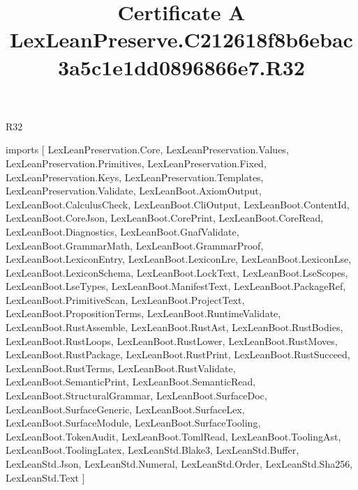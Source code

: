\begin{lexlean}{R32}
\title{Certificate A LexLeanPreserve.C212618f8b6ebac3a5c1e1dd0896866e7.R32}
\begin{coremodule}
imports [
  LexLeanPreservation.Core,
  LexLeanPreservation.Values,
  LexLeanPreservation.Primitives,
  LexLeanPreservation.Fixed,
  LexLeanPreservation.Keys,
  LexLeanPreservation.Templates,
  LexLeanPreservation.Validate,
  LexLeanBoot.AxiomOutput,
  LexLeanBoot.CalculusCheck,
  LexLeanBoot.CliOutput,
  LexLeanBoot.ContentId,
  LexLeanBoot.CoreJson,
  LexLeanBoot.CorePrint,
  LexLeanBoot.CoreRead,
  LexLeanBoot.Diagnostics,
  LexLeanBoot.GnafValidate,
  LexLeanBoot.GrammarMath,
  LexLeanBoot.GrammarProof,
  LexLeanBoot.LexiconEntry,
  LexLeanBoot.LexiconLre,
  LexLeanBoot.LexiconLse,
  LexLeanBoot.LexiconSchema,
  LexLeanBoot.LockText,
  LexLeanBoot.LseScopes,
  LexLeanBoot.LseTypes,
  LexLeanBoot.ManifestText,
  LexLeanBoot.PackageRef,
  LexLeanBoot.PrimitiveScan,
  LexLeanBoot.ProjectText,
  LexLeanBoot.PropositionTerms,
  LexLeanBoot.RuntimeValidate,
  LexLeanBoot.RustAssemble,
  LexLeanBoot.RustAst,
  LexLeanBoot.RustBodies,
  LexLeanBoot.RustLoops,
  LexLeanBoot.RustLower,
  LexLeanBoot.RustMoves,
  LexLeanBoot.RustPackage,
  LexLeanBoot.RustPrint,
  LexLeanBoot.RustSucceed,
  LexLeanBoot.RustTerms,
  LexLeanBoot.RustValidate,
  LexLeanBoot.SemanticPrint,
  LexLeanBoot.SemanticRead,
  LexLeanBoot.StructuralGrammar,
  LexLeanBoot.SurfaceDoc,
  LexLeanBoot.SurfaceGeneric,
  LexLeanBoot.SurfaceLex,
  LexLeanBoot.SurfaceModule,
  LexLeanBoot.SurfaceTooling,
  LexLeanBoot.TokenAudit,
  LexLeanBoot.TomlRead,
  LexLeanBoot.ToolingAst,
  LexLeanBoot.ToolingLatex,
  LexLeanStd.Blake3,
  LexLeanStd.Buffer,
  LexLeanStd.Json,
  LexLeanStd.Numeral,
  LexLeanStd.Order,
  LexLeanStd.Sha256,
  LexLeanStd.Text
]


\end{coremodule}
\end{lexlean}

